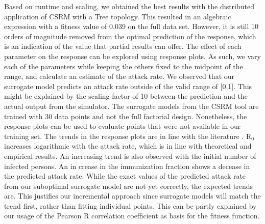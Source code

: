 Based on runtime and scaling, we obtained the best results with the distributed application of CSRM with a Tree topology. This resulted in an algebraic expression with a fitness value of 0.039 on the full data set. However, it is still 10 orders of magnitude removed from the optimal prediction of the response, which is an indication of the value that partial results can offer. 
The effect of each parameter on the response can be explored using response plots. As such, we vary each of the parameters while keeping the others fixed to the midpoint of the range, and calculate an estimate of the attack rate. We observed that our surrogate model predicts an attack rate outside of the valid range of [0,1]. This might be explained by the scaling factor of 10 between the prediction and the actual output from the simulator. The surrogate models from the CSRM tool are trained with 30 data points and not the full factorial design. Nonetheless, the response plots can be used to evaluate points that were not available in our training set. The trends in the response plots are in line with the literature \cite{FRED}.  R$_0$ increases logarithmic with the attack rate, which is in line with theoretical and empirical results. An increasing trend is also observed with the initial number of infected persons. An in crease in the immunization fraction shows a decease in the predicted attack rate. While the exact values of the predicted attack rate from our suboptimal surrogate model are not yet correctly, the expected trends are. This justifies our incremental approach since surrogate models will  match the trend first, rather than fitting individual points. This can be partly explained by our usage of the Pearson R correlation coefficient as basis for the fitness function. 

